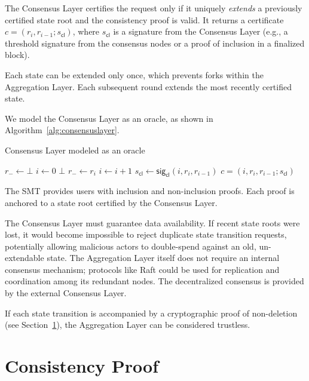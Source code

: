 \documentclass[twocolumn]{article}
\begin{document}
The Consensus Layer certifies the request only if it uniquely \textit{extends} a previously certified state root and the consistency proof is valid. It returns a certificate $c = (r_i, r_{i-1}; s_{\textsf{cl}})$, where $s_{\textsf{cl}}$ is a signature from the Consensus Layer (e.g., a threshold signature from the consensus nodes or a proof of inclusion in a finalized block).

Each state can be extended only once, which prevents forks within the Aggregation Layer. Each subsequent round extends the most recently certified state.

We model the Consensus Layer as an oracle, as shown in Algorithm~\ref{alg:consensuslayer}.

\begin{algorithm}[tbh]
  \caption{Consensus Layer modeled as an oracle}\label{alg:consensuslayer}
  \begin{algorithmic}[0]
        \State $r_- \gets \bot$
        \State $i \gets 0$
    \EndFunction
            \State \Return $\bot$
        \EndIf
        \State $r_- \gets r_i$
        \State $i \gets i+1$
        \State $s_{\textsf{cl}} \gets \textsf{sig}_\textsf{cl}(i, r_i, r_{i-1})$
        \State \Return $c = (i, r_i, r_{i-1}; s_{\textsf{cl}})$
    \EndFunction
  \end{algorithmic}
\end{algorithm}


The SMT provides users with inclusion and non-inclusion proofs. Each proof is anchored to a state root certified by the Consensus Layer.

The Consensus Layer must guarantee data availability. If recent state roots were lost, it would become impossible to reject duplicate state transition requests, potentially allowing malicious actors to double-spend against an old, un-extendable state. The Aggregation Layer itself does not require an internal consensus mechanism; protocols like Raft could be used for replication and coordination among its redundant nodes. The decentralized consensus is provided by the external Consensus Layer.

If each state transition is accompanied by a cryptographic proof of non-deletion (see Section~\ref{sec:consistency-proof}), the Aggregation Layer can be considered trustless.


\section{Consistency Proof}
\label{sec:consistency-proof}
\end{document}
